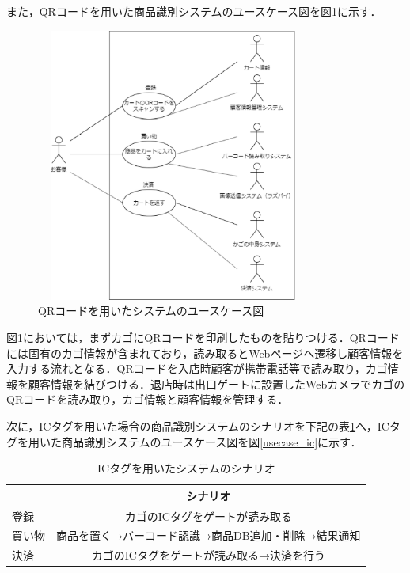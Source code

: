 また，QRコードを用いた商品識別システムのユースケース図を図\ref{usecase_qr}に示す．

\begin{figure}[htbp]
\centering
\includegraphics[height = 9cm,width = 9cm]{./picture/usecase_qr.eps}
\caption{QRコードを用いたシステムのユースケース図}
\label{usecase_qr}
\end{figure}

図\ref{usecase_qr}においては，まずカゴにQRコードを印刷したものを貼りつける．QRコードには固有のカゴ情報が含まれており，読み取るとWebページへ遷移し顧客情報を入力する流れとなる．QRコードを入店時顧客が携帯電話等で読み取り，カゴ情報を顧客情報を結びつける．退店時は出口ゲートに設置したWebカメラでカゴのQRコードを読み取り，カゴ情報と顧客情報を管理する．


次に，ICタグを用いた場合の商品識別システムのシナリオを下記の表\ref{sina_ic}へ，ICタグを用いた商品識別システムのユースケース図を図\ref{usecase_ic}に示す．


\begin{table}[htb]
\begin{center}
\caption{ICタグを用いたシステムのシナリオ}
\begin{tabular}{|l|c|} \hline
 & シナリオ \\ \hline \hline
登録 & カゴのICタグをゲートが読み取る \\
買い物 & 商品を置く→バーコード認識→商品DB追加・削除→結果通知 \\
決済 & カゴのICタグをゲートが読み取る→決済を行う \\ \hline
\end{tabular}
\label{sina_ic}
\end{center}
\end{table}



